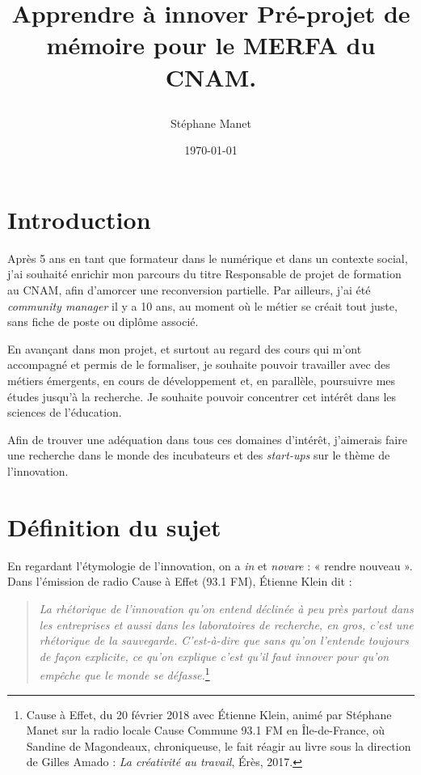 \documentclass{article}
\author{Stéphane Manet}
\date{\today}
\title{%
    \begin{minipage}\linewidth
        \centering\bfseries
        Apprendre à innover
        \vskip3pt
        \large Pré-projet de mémoire pour le MERFA du CNAM.
    \end{minipage}
}
\begin{document}
\maketitle %
\tableofcontents

\section*{Introduction}

Après 5 ans en tant que formateur dans le numérique et dans un contexte social, j'ai souhaité enrichir mon parcours du titre Responsable de projet de formation au CNAM, afin d'amorcer une reconversion partielle. 
Par ailleurs, j'ai été \emph{community manager} il y a 10 ans, au moment où le métier se créait tout juste, sans fiche de poste ou diplôme associé. 

En avançant dans mon projet, et surtout au regard des cours qui m'ont accompagné et permis de le formaliser, je souhaite pouvoir travailler avec des métiers émergents, en cours de développement et, en parallèle, poursuivre mes études jusqu'à la recherche. Je souhaite pouvoir concentrer cet intérêt dans les sciences de l'éducation.

Afin de trouver une adéquation dans tous ces domaines d'intérêt, j'aimerais faire une recherche dans le monde des incubateurs et des \emph{start-ups} sur le thème de l'innovation.

\section{Définition du sujet}

En regardant l'étymologie de l'innovation, on a \emph{in} et \emph{novare} : « rendre nouveau ». Dans l'émission de radio Cause à Effet (93.1 FM), Étienne Klein dit :

\begin{quote}
\textit{La rhétorique de l'innovation qu'on entend déclinée à peu près partout dans les entreprises et aussi dans les laboratoires de recherche, en gros, c'est une rhétorique de la sauvegarde. C'est-à-dire que sans qu'on l'entende toujours de façon explicite, ce qu'on explique c'est qu'il faut innover pour qu'on empêche que le monde se défasse.}\footnote{Cause à Effet, du 20 février 2018 avec Étienne Klein, animé par Stéphane Manet sur la radio locale Cause Commune 93.1 FM en Île-de-France, où Sandine de Magondeaux, chroniqueuse, le fait réagir au livre sous la direction de Gilles Amado : \emph{La créativité au travail}, Érès, 2017.}
\end{quote} 
\end{document}

